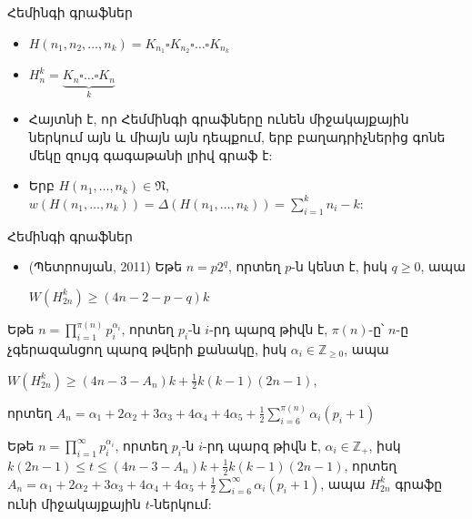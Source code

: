 \begin{frame}{Հեմինգի գրաֆներ}
\begin{itemize}
\item $ H(n_1,n_2,\ldots,n_k) = K_{n_1} \square K_{n_2} \square \ldots \square K_{n_k} $\\
\item $ H_n^k = \underset{k}{\underbrace{K_n \square \ldots \square K_n}} $
\item Հայտնի է, որ Հեմմինգի գրաֆները ունեն միջակայքային ներկում այն և միայն այն դեպքում, երբ բաղադրիչներից գոնե մեկը զույգ գագաթանի լրիվ գրաֆ է: 
\item Երբ $H(n_1,\ldots,n_k)\in \mathfrak{N}$,
$w(H(n_1,\ldots,n_k))=\Delta(H(n_1,\ldots,n_k))=\sum\limits_{i=1}^k{n_i}-k$:
\end{itemize}
\end{frame}


\begin{frame}{Հեմինգի գրաֆներ}
\begin{itemize}
\item (Պետրոսյան, 2011) Եթե $n=p2^q$, որտեղ $p$-ն կենտ է, իսկ $q\geq0$, ապա
\begin{center}
$W(H_{2n}^k) \geq (4n-2-p-q)k$
\end{center}
\end{itemize}

\begin{theorem}[2.6.3]
Եթե $n = \prod\limits_{i=1}^{\pi(n)}{p_i^{\alpha_i}}$, որտեղ $p_i$-ն $i$-րդ պարզ թիվն է, $\pi(n)$-ը՝ $n$-ը չգերազանցող պարզ թվերի քանակը, իսկ $\alpha_i \in \mathbb{Z}_{\geq 0}$, ապա
\begin{center}
$W(H_{2n}^k) \geq (4n - 3 - A_n)k + \frac{1}{2}k(k-1)(2n-1)$,
\end{center}
որտեղ $A_n = \alpha_1 + 2\alpha_2 + 3\alpha_3 + 4\alpha_4 + 4\alpha_5 + \frac{1}{2}\sum\limits_{i=6}^{\pi(n)}{\alpha_i(p_i+1)}$
\end{theorem}

\begin{hide}
\begin{corollary}
Եթե $n = \prod\limits_{i=1}^{\infty}{p_i^{\alpha_i}}$, որտեղ $p_i$-ն $i$-րդ պարզ թիվն է, $\alpha_i \in \mathbb{Z}_+$, իսկ $k(2n-1) \leq t \leq (4n - 3 - A_n)k + \frac{1}{2}k(k-1)(2n-1)$,
որտեղ $A_n = \alpha_1 + 2\alpha_2 + 3\alpha_3 + 4\alpha_4 + 4\alpha_5 + \frac{1}{2}\sum\limits_{i=6}^{\infty}{\alpha_i(p_i+1)}$, ապա $H_{2n}^k$ գրաֆը ունի միջակայքային $t$-ներկում:
\end{corollary}
\end{hide}
\end{frame}

